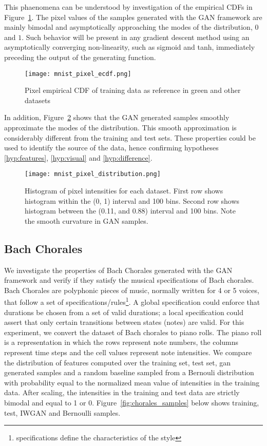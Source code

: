This phaenomena can be understood by investigation of the empirical CDFs 
in Figure~\ref{fig:mnist_pixel_ecdf}. The pixel values of the samples
generated with the GAN framework are mainly bimodal and asymptotically
approaching the modes of the distribution, $0$ and $1$. Such behavior will be
present in any gradient descent method using an asymptotically converging 
non-linearity, such as sigmoid and tanh, immediately preceding the output of 
the generating function.

\begin{figure}[!h]
  \texttt{[image: mnist\_pixel\_ecdf.png]}
    \caption{Pixel empirical CDF of training data as reference in green and other datasets}
  \label{fig:mnist_pixel_ecdf}
\end{figure}

In addition, Figure~\ref{fig:mnist_pixel_distribution} shows that the GAN
generated samples smoothly approximate the modes of the distribution. This
smooth approximation is considerably different from the training and test sets.
These properties could be used to identify the source of the data, hence
confirming hypotheses \ref{hyp:features}, \ref{hyp:visual} and 
\ref{hyp:difference}.

\begin{figure}[!h]
  \texttt{[image: mnist\_pixel\_distribution.png]}
  \caption{Histogram of pixel intensities for each dataset. First row shows
    histogram within the (0, 1) interval and 100 bins. Second row shows histogram
    between the (0.11, and 0.88) interval and 100 bins. Note the smooth
    curvature in GAN samples.}
  \label{fig:mnist_pixel_distribution}
\end{figure}

\subsection{Bach Chorales}
We investigate the properties of Bach Chorales generated with the GAN framework
and verify if they satisfy the musical specifications of Bach chorales.
Bach Chorales are polyphonic pieces of music, normally
written for 4 or 5 voices, that follow a set of
specifications/rules\footnote{specifications define the characteristics of the 
style}. A global specification could enforce that durations be chosen from a set 
of valid durations; a local specification could assert that only certain
transitions between states (notes) are valid. 
For this experiment, we convert the dataset of Bach chorales to piano rolls. The
piano roll is a representation in which the rows represent note numbers, the columns
represent time steps and the cell values represent note intensities. We compare
the distribution of features computed over the training set, test set, gan
generated samples and a random baseline sampled from a Bernouli distribution with 
probability equal to the normalized mean value of intensities in the
training data. After scaling, the intensities in the training and test data are
strictly bimodal and equal to 1 or 0. Figure~\ref{fig:chorales_samples} below
shows training, test, IWGAN and Bernoulli samples. 

